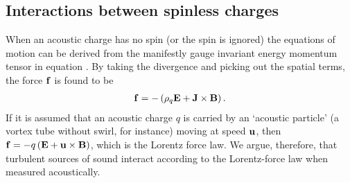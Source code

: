 




\subsection{Interactions between spinless charges}\label{sec:spinless}
When an acoustic charge has no spin (or the spin is ignored)
the equations of motion can be derived from the manifestly gauge invariant energy momentum tensor in  equation .
By taking the  divergence and picking out the spatial terms,
the force $\mathbf{f}$ is found to be \cite{Doran2003}
\begin{align}
  \mathbf{f} = - \left( \rho_q\mathbf{E} + \mathbf{J} \times \mathbf{B} \right).
\end{align}
If it is assumed that an acoustic charge $q$ is carried by an `acoustic particle' (a vortex tube without swirl, for instance)
moving at speed $\textbf{u}$, then
$\mathbf{f} = - q\left( \mathbf{E} + \textbf{u} \times \mathbf{B} \right)$, which is the Lorentz force law.
We argue, therefore, that turbulent sources of sound interact according to the Lorentz-force law when measured acoustically.


